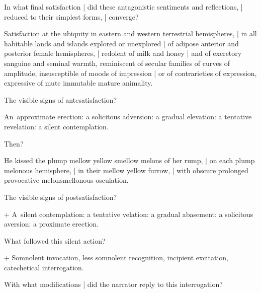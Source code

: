 In what final satisfaction |
did these antagonistic sentiments and reflections, |
reduced to their simplest forms, |
converge?

\Poetry[~(emotion)]
Satisfaction at the ubiquity in eastern and western terrestrial hemispheres, |
in all habitable lands and islands explored or unexplored |
of adipose anterior and posterior female hemispheres, |
redolent of milk and honey |
and of excretory sanguine and seminal warmth,
reminiscent of secular families of curves of amplitude,
insusceptible of moods of impression |
or of contrarieties of expression,
expressive of mute immutable mature animality.


The visible signs of antesatisfaction?

\Science
An~approximate erection:
a solicitous adversion:
a gradual elevation:
a tentative revelation:
a silent contemplation.


Then?%

\Poetry[~(emotion)]
He kissed the plump mellow yellow smellow melons of her rump, |
on each plump melonous hemisphere, |
in their mellow yellow furrow, |
with obscure prolonged provocative melonsmellonous osculation.


The visible signs of postsatisfaction?

\Factual + \Science
A~silent contemplation:
a tentative velation:
a gradual abasement:
a solicitous aversion:
a proximate erection.



What followed this silent action?

\Factual + \Science
Somnolent invocation,
less somnolent recognition,
incipient excitation,
catechetical interrogation.



With what modifications |
did the narrator reply to this interrogation?

